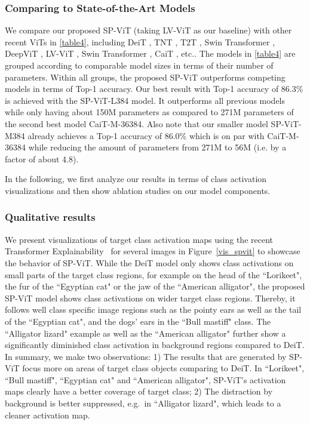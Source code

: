 \documentclass[authorversion, sigconf, acmthm=false, nonacm=true]{acmart}
\begin{document}
\subsubsection{Comparing to State-of-the-Art Models}
We compare our proposed SP-ViT (taking LV-ViT as our baseline) with other recent ViTs in \cref{table4},
including DeiT \cite{touvron2021training}, TNT \cite{han2021transformer}, T2T \cite{yuan2021tokens}, Swin Transformer \cite{liu2021swin}, DeepViT \cite{zhou2021deepvit},
LV-ViT \cite{jiang2021all}, Swin Transformer \cite{liu2021swin}, CaiT \cite{touvron2021going}, etc.. The models in \cref{table4} are grouped according to comparable model sizes in terms of their number of parameters. Within all groups, the proposed SP-ViT outperforms competing models in terms of Top-1 accuracy. Our best result with Top-1 accuracy of 86.3\% is achieved with the SP-ViT-L384 model. It outperforms all previous models while only having about 150M parameters as compared to 271M parameters of the second best model CaiT-M-36384. Also note that our smaller model SP-ViT-M384 already achieves a Top-1 accuracy of 86.0\% which is on par with CaiT-M-36384 while reducing the amount of parameters from 271M to 56M (i.e. by a factor of about 4.8). 

In the following, we first analyze our results in terms of class activation visualizations and then show ablation studies on our model components.











 
 





\subsubsection{Qualitative results}

We present visualizations of target class activation maps using the recent Transformer Explainability~\cite{Chefer_2021_CVPR} for several images  in Figure~\ref{vis_spvit} to showcase the behavior of SP-ViT. While the DeiT model only shows class activations on small parts of the target class regions, for example on the head of the ``Lorikeet", the fur of the ``Egyptian cat" or the jaw of the ``American alligator", the proposed SP-ViT model shows class activations on wider target class regions. Thereby, it follows well class specific image regions such as the pointy ears as well as the tail of the ``Egyptian cat", and the dogs' ears in the ``Bull mastiff" class. The ``Alligator lizard" example as well as the ``American alligator" further show a significantly diminished class activation in background regions compared to DeiT. In summary, we make two observations: 1) The results that are generated by SP-ViT focus more on areas of target class objects comparing to DeiT. In ``Lorikeet", ``Bull mastiff", ``Egyptian cat" and ``American alligator", SP-ViT's activation maps clearly have a better coverage of target class; 2) The distraction by background is better suppressed, e.g.~in ``Alligator lizard", which leads to a cleaner activation map. 
\end{document}
